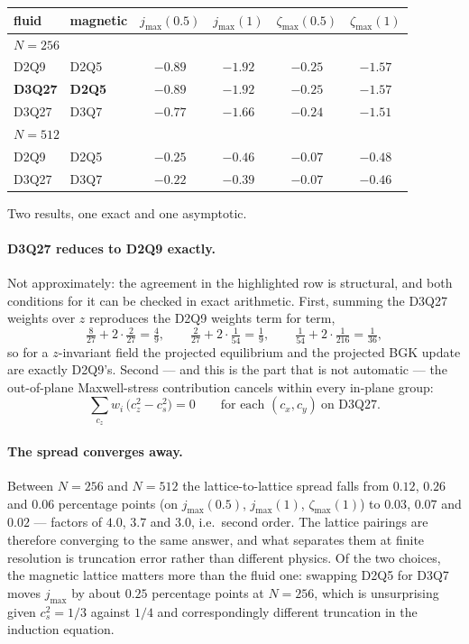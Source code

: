 \documentclass[11pt,a4paper]{article}
\newcommand{\cs}{c_s}
\begin{document}
\begin{center}\small
\begin{tabular}{llcccc}
\toprule
fluid & magnetic & $j_{\max}(0.5)$ & $j_{\max}(1)$ & $\zeta_{\max}(0.5)$ & $\zeta_{\max}(1)$ \\
\midrule
\multicolumn{6}{l}{\emph{$N=256$}}\\
D2Q9  & D2Q5 & $-0.89$ & $-1.92$ & $-0.25$ & $-1.57$ \\
\textbf{D3Q27} & \textbf{D2Q5} & $\bm{-0.89}$ & $\bm{-1.92}$ & $\bm{-0.25}$ & $\bm{-1.57}$ \\
D3Q27 & D3Q7 & $-0.77$ & $-1.66$ & $-0.24$ & $-1.51$ \\
\midrule
\multicolumn{6}{l}{\emph{$N=512$}}\\
D2Q9  & D2Q5 & $-0.25$ & $-0.46$ & $-0.07$ & $-0.48$ \\
D3Q27 & D3Q7 & $-0.22$ & $-0.39$ & $-0.07$ & $-0.46$ \\
\bottomrule
\end{tabular}
\end{center}

Two results, one exact and one asymptotic.

\paragraph{D3Q27 reduces to D2Q9 exactly.} Not approximately: the agreement in
the highlighted row is structural, and both conditions for it can be checked in
exact arithmetic. First, summing the D3Q27 weights over $z$ reproduces the D2Q9
weights term for term,
\begin{equation}
  \tfrac{8}{27}+2\cdot\tfrac{2}{27} = \tfrac49, \qquad
  \tfrac{2}{27}+2\cdot\tfrac{1}{54} = \tfrac19, \qquad
  \tfrac{1}{54}+2\cdot\tfrac{1}{216} = \tfrac1{36},
\end{equation}
so for a $z$-invariant field the projected equilibrium and the projected BGK
update are exactly D2Q9's. Second --- and this is the part that is not automatic
--- the out-of-plane Maxwell-stress contribution cancels within every in-plane
group:
\begin{equation}
  \sum_{c_z} w_i\,\big(c_z^2-\cs^2\big) = 0
  \qquad\text{for each } (c_x,c_y) \ \text{on D3Q27}.
\end{equation}

\paragraph{The spread converges away.} Between $N=256$ and $N=512$ the
lattice-to-lattice spread falls from $0.12$, $0.26$ and $0.06$ percentage points
(on $j_{\max}(0.5)$, $j_{\max}(1)$, $\zeta_{\max}(1)$) to $0.03$, $0.07$ and
$0.02$ --- factors of $4.0$, $3.7$ and $3.0$, i.e.\ second order. The lattice
pairings are therefore converging to the same answer, and what separates them at finite
resolution is truncation error rather than different physics. Of the two
choices, the magnetic lattice matters more than the fluid one: swapping D2Q5 for
D3Q7 moves $j_{\max}$ by about $0.25$ percentage points at $N=256$, which is
unsurprising given $\cs^2=1/3$ against $1/4$ and correspondingly different
truncation in the induction equation.
\end{document}
